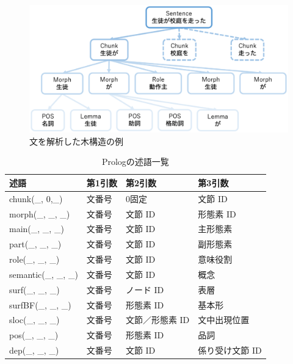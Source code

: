 \documentclass{FITpaper}
\begin{document}
\begin{figure}[htbp]
  \centering
  \includegraphics[scale=0.4]{fig/tree.eps}
  \caption{文を解析した木構造の例}
  \label{fig:tree}
\end{figure}
\begin{table}[htbp]
  \caption{Prologの述語一覧}
  {\footnotesize
  \begin{center}
    \begin{tabular}{|l|l|l|l|}\hline
      述語                    &第1引数     &  第2引数   & 第3引数               \\
      \hline 

      chunk(\_, 0,\_)       &文番号    &  0固定& 文節 ID                   \\
      morph(\_, \_, \_)     &文番号 & 文節 ID& 形態素 ID                \\
      main(\_, \_, \_)      &文番号   &文節 ID & 主形態素 \\
      part(\_, \_, \_)      &文番号   &文節 ID& 副形態素\\
      role(\_, \_, \_)      &文番号   &文節 ID& 意味役割  \\
      semantic(\_, \_, \_)   &文番号  &文節 ID & 概念\\
      surf(\_, \_, \_)        &文番号  &ノード ID& 表層\\               
      surfBF(\_, \_, \_)      &文番号 &形態素 ID& 基本形        \\
      sloc(\_, \_, \_)  &文番号&文節／形態素 ID & 文中出現位置\\
      pos(\_, \_, \_)    &文番号      &形態素 ID& 品詞\\                                        
      dep(\_, \_, \_)     &文番号   &文節 ID & 係り受け文節 ID\\
        \hline
    \end{tabular}
  
    \label{tbl:predicates}
  \end{center}
  }
\end{table}
\end{document}
